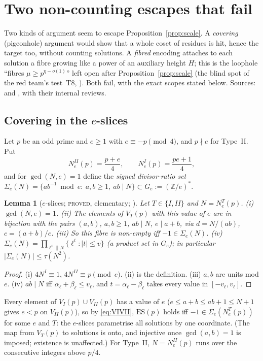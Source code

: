 \documentclass[10pt,reqno]{amsart}
\newtheorem{lemma}[theorem]{Lemma}
\theoremstyle{definition}
\numberwithin{equation}{section}
\newcommand{\Z}{\mathbb Z}
\newcommand{\status}[1]{\textup{\textsc{#1}}}
\begin{document}
\section{Two non-counting escapes that fail}\label{sec:longshots}
Two kinds of argument seem to escape Proposition~\ref{prop:scale}. A
\emph{covering} (pigeonhole) argument would show that a whole coset of
residues is hit, hence the target too, without counting solutions. A
\emph{fibred} encoding attaches to each solution a fibre growing like a
power of an auxiliary height $H$; this is the loophole ``fibres
$\mu\ge p^{\eta-o(1)}$'' left open after Proposition~\ref{prop:scale} (the
blind spot of the red team's test~T8, \cite[\S5.5]{RT1}). Both fail, with
the exact scopes stated below. Sources: \cite{LP} and \cite{LF}, with
their internal reviews.

\subsection{Covering in the $e$-slices}\label{ssec:cover}
Let $p$ be an odd prime and $e\ge1$ with $e\equiv-p\pmod4$, and $p\nmid e$ for Type~II. Put
\[N_e^{II}(p)=\frac{p+e}4,\qquad N_e^{I}(p)=\frac{pe+1}4,\]
and for $\gcd(N,e)=1$ define the \emph{signed divisor-ratio set}
$\Sigma_e(N)=\{ab^{-1}\bmod e:\ a,b\ge1,\ ab\mid N\}\subset G_e:=(\Z/e)^*$.

\begin{lemma}[$e$-slices; \status{proved}, elementary; {\cite[Lemma~1.1]{LP}}]\label{lem:eslice}
Let $T\in\{I,II\}$ and $N=N_e^T(p)$. \textup{(i)} $\gcd(N,e)=1$.
\textup{(ii)} The elements of $V_T(p)$ with this value of $e$ are in
bijection with the pairs $(a,b)$, $a,b\ge1$, $ab\mid N$, $e\mid a+b$, via
$d=N/(ab)$, $c=(a+b)/e$. \textup{(iii)} So this fibre is non-empty iff
$-1\in\Sigma_e(N)$. \textup{(iv)}
$\Sigma_e(N)=\prod_{\ell^v\parallel N}\{\ell^t:|t|\le v\}$ (a product set in
$G_e$); in particular $|\Sigma_e(N)|\le\tau(N^2)$.
\end{lemma}
\begin{proof}
(i) $4N^I\equiv1$, $4N^{II}\equiv p\pmod e$. (ii) is the definition. (iii) $a,b$
are units mod $e$. (iv) $ab\mid N$ iff $\alpha_\ell+\beta_\ell\le v_\ell$, and
$t=\alpha_\ell-\beta_\ell$ takes every value in $[-v_\ell,v_\ell]$.
\end{proof}
Every element of $V_I(p)\cup V_{II}(p)$ has a value of $e$ ($e\le a+b\le ab+1\le N+1$ gives $e<p$ on $V_{II}(p)$), so by
\eqref{eq:VIVII}, $\mathrm{ES}(p)$ holds iff $-1\in\Sigma_e(N_e^T(p))$ for some
$e$ and $T$: the $e$-slices parametrise all solutions by one coordinate.
(The map from $V_T(p)$ to solutions is onto, and injective once
$\gcd(a,b)=1$ is imposed; existence is unaffected.) For Type~II,
$N=N_e^{II}(p)$ runs over the consecutive integers above $p/4$.
\end{document}
